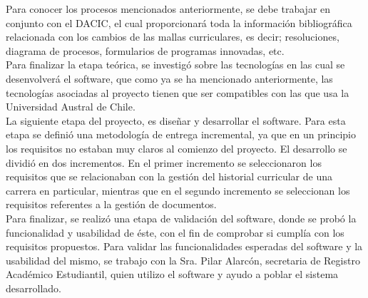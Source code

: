 Para conocer los procesos mencionados anteriormente, se debe trabajar en conjunto con el DACIC, el cual proporcionará toda la información bibliográfica relacionada con los cambios de las mallas curriculares, es decir; resoluciones, diagrama de procesos, formularios de programas innovadas, etc.
\\

Para finalizar la etapa teórica, se investigó sobre las tecnologías en las cual se desenvolverá el software, que como ya se ha mencionado anteriormente, las tecnologías asociadas al proyecto tienen que ser compatibles con las que usa la Universidad Austral de Chile.
\\


La siguiente etapa del proyecto, es diseñar y desarrollar el software. Para esta etapa se definió una metodología de entrega incremental, ya que en un principio los requisitos no estaban muy claros al comienzo del proyecto. El desarrollo se dividió en dos incrementos. En el primer incremento se seleccionaron los requisitos que se relacionaban con la gestión del historial curricular de una carrera en particular, mientras que en el segundo incremento se seleccionan los requisitos referentes a la gestión de documentos.
\\

Para finalizar, se realizó una etapa de validación del software, donde se probó la funcionalidad y usabilidad de éste, con el fin de comprobar si cumplía con los requisitos propuestos. Para validar las funcionalidades esperadas del software y la usabilidad del mismo, se trabajo con la Sra. Pilar Alarcón, secretaria de Registro Académico Estudiantil, quien utilizo el software y ayudo a poblar el sistema desarrollado.

